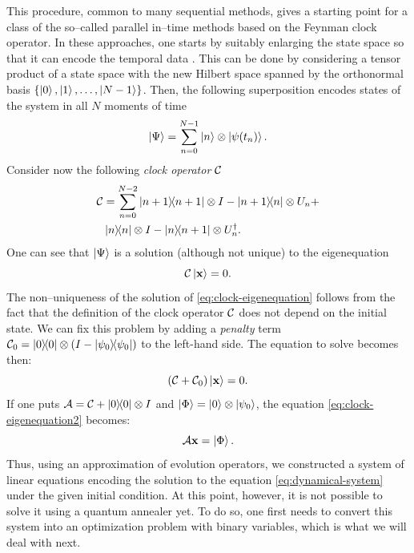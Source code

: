 This procedure, common to many sequential methods, gives a starting point for a class of the so--called parallel in--time methods based on the Feynman clock operator. In these approaches, one starts by suitably enlarging the state space so that it can encode the temporal data        . This can be done by considering a tensor product of a state space with the new Hilbert space spanned by the orthonormal basis $\{\ket{0}, \ket{1}, \ldots, \ket{N-1}\}$. Then, the following superposition encodes states of the system in all $N$ moments of time
%
\begin{equation}
	\ket{\Psi} = \sum_{n=0}^{N-1} \ket{n} \otimes \ket{\psi(t_n)}.
\end{equation}
Consider now the following \emph{clock operator} $\mathcal{C}$
\begin{eqnarray}
	\label{eq:clock2}
	\mathcal{C}
	& =
	\sum_{n=0}^{N-2}
	\ketbra{n+1}{n+1} \otimes I - \ketbra{n+1}{n} \otimes U_n + \\
	&\ketbra{n}{n} \otimes I - \ketbra{n}{n+1}\otimes U_{n}^{\dagger}.
\end{eqnarray}
One can see that $\ket{\Psi}$ is a solution (although not unique) to the eigenequation
\begin{equation}
	\label{eq:clock-eigenequation}
	\mathcal{C} \ket{\mathbf{x}} = 0.
\end{equation}
The non--uniqueness of the solution of \ref{eq:clock-eigenequation} follows from the fact that the
definition of the clock operator $\mathcal{C}$ does not depend on the initial state.
We can fix this problem by adding a \emph{penalty} term $\mathcal{C}_0 = \ketbra{0}{0}\otimes(I-\ketbra{\psi_0}{\psi_0})$ to the
left-hand side. The equation to solve becomes then:
\begin{equation}
	\label{eq:clock-eigenequation2}
	(\mathcal{C} + \mathcal{C}_0) \ket{\mathbf{x}} = 0.
\end{equation}
If one puts $\mathcal{A}=\mathcal{C} + \ketbra{0}{0} \otimes I$ and $\ket{\Phi} = \ket{0}\otimes \ket{\psi_0}$, the equation \ref{eq:clock-eigenequation2} becomes:
\begin{equation}
	\label{eq:gsys}
	\mathcal{A} \mathbf{x} = \ket{\Phi}.
\end{equation}
Thus, using an approximation of evolution operators, we constructed a system of linear equations encoding the solution to the equation \eqref{eq:dynamical-system} under the given initial condition. At this point, however, it is not possible to solve it using a quantum annealer yet. To do so, one first needs to convert this system into an optimization problem
with binary variables, which is what we will deal with next.
